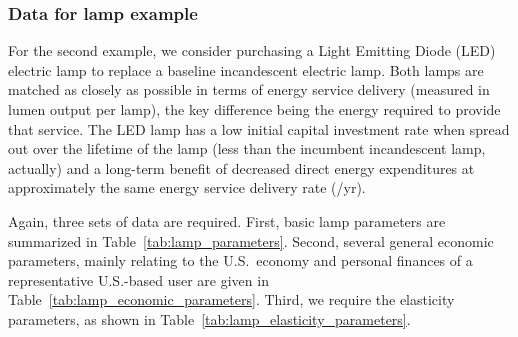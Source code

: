 \documentclass[12pt]{article}\usepackage[]{graphicx}\usepackage[]{xcolor}
\begin{document}
\subsubsection{Data for lamp example} 
\label{sec:data_lamp_example}




For the second example, 
we consider purchasing a Light Emitting Diode (LED) electric lamp
to replace a baseline incandescent electric lamp. 
Both lamps are matched as closely as possible 
in terms of energy service delivery (measured in lumen output per lamp), 
the key difference being the energy required to provide that service. 
The LED lamp has a low 
initial capital investment rate
when spread out over the lifetime of the lamp
(less than the incumbent incandescent lamp, actually)
and a long-term benefit of decreased direct energy expenditures
at approximately the same energy service delivery rate (\lmhr/yr).

Again, three sets of data are required. 
First, basic lamp parameters are summarized in Table~\ref{tab:lamp_parameters}. 
Second, several general economic parameters, 
mainly relating to the U.S.\ economy and 
personal finances 
of a representative U.S.-based user are
given in Table~\ref{tab:lamp_economic_parameters}.
Third, we require the elasticity parameters, 
as shown in Table~\ref{tab:lamp_elasticity_parameters}.
\end{document}
